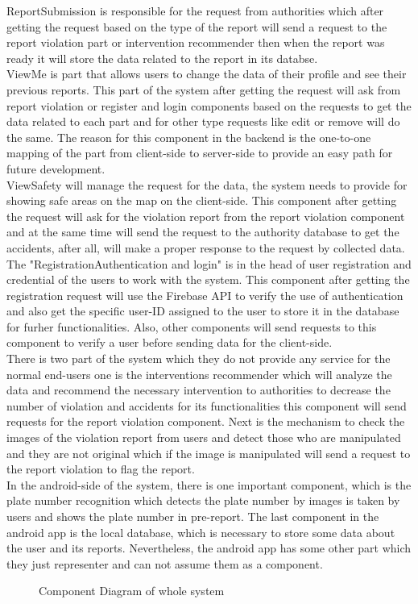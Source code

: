ReportSubmission is responsible for the request from authorities which after getting the request based on the type of the report will send a request to the report violation part or intervention recommender then when the report was ready it will store the data related to the report in its databse. \\
ViewMe is part that allows users to change the data of their profile and see their previous reports. This part of the system after getting the request will ask from report violation or register and login components based on the requests to get the data related to each part and for other type requests like edit or remove will do the same. The reason for this component in the backend is the one-to-one mapping of the part from client-side to server-side to provide an easy path for future development. \\
ViewSafety will manage the request for the data, the system needs to provide for showing safe areas on the map on the client-side. This component after getting the request will ask for the violation report from the report violation component and at the same time will send the request to the authority database to get the accidents, after all, will make a proper response to the request by collected data.
The "Registration\/Authentication and login" is in the head of user registration and credential of the users to work with the system. This component after getting the registration request will use the Firebase API to verify the use of authentication and also get the specific user-ID assigned to the user to store it in the database for furher functionalities.  Also, other components will send requests to this component to verify a user before sending data for the client-side. \\
There is two part of the system which they do not provide any service for the normal end-users one is the interventions recommender which will analyze the data and recommend the necessary intervention to authorities to decrease the number of violation and accidents for its functionalities this component will send requests for the report violation component. Next is the mechanism to check the images of the violation report from users and detect those who are manipulated and they are not original which if the image is manipulated will send a request to the report violation to flag the report. \\
In the android-side of the system, there is one important component, which is the plate number recognition which detects the plate number by images is taken by users and shows the plate number in pre-report. The last component in the android app is the local database, which is necessary to store some data about the user and its reports. Nevertheless, the android app has some other part which they just representer and can not assume them as a component.


\begin{sidewaysfigure}
\begin{figure}[H]
\caption{Component Diagram of whole system}
\label{fig:Class}
\centering

\end{figure}
\end{sidewaysfigure}

